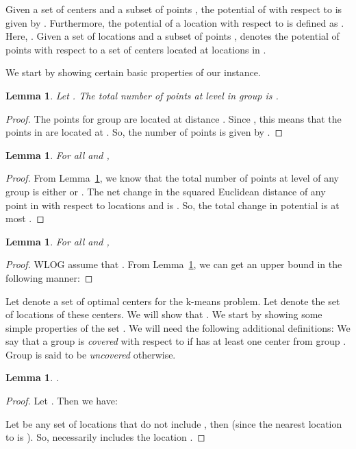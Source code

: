 \documentclass[11pt]{article}
\newtheorem{lemma}[theorem]{Lemma}
\begin{document}
Given a set  of centers and a subset of points , the potential of  with respect to  is given by  . 
Furthermore, the potential of a location  with respect to  is defined as .
Here, .
Given a set of locations  and a subset of points ,  denotes the potential of points  with respect to a set of centers located at locations in .

We start by showing certain basic properties of our instance.

\begin{lemma}\label{lemma:2}
Let . The total number of points  at level  in group  is .
\end{lemma}
\begin{proof}
The points for group  are located at distance .
Since , this means that the points in  are located at .
So, the number of points is given by .
\end{proof}

\begin{lemma}\label{lemma:3}
For all  and , 
\end{lemma}
\begin{proof}
From Lemma~\ref{lemma:2}, we know that the total number of points at level  of any group is either  or . 
The net change in the squared Euclidean distance of any point in  with respect to locations  and  is . 
So, the total change in potential is at most .
\end{proof}

\begin{lemma}\label{lemma:4}
For all  and ,  

\end{lemma}
\begin{proof}
WLOG assume that . 
From Lemma~\ref{lemma:2}, we can get an upper bound in the following manner:

\end{proof}

Let  denote a set of optimal centers for the k-means problem. 
Let  denote the set of locations of these centers.
We will show that .
We start by showing some simple properties of the set .
We will need the following additional definitions:
We say that a group  is {\em covered} with respect to  if  has at least one center from group . Group  is said to be {\em uncovered} otherwise.


\begin{lemma}
.
\end{lemma}
\begin{proof}
Let . Then we have:

Let  be any set of locations that do not include , then  (since the nearest location to  is ).
So,  necessarily includes the location .
\end{proof}
\end{document}
